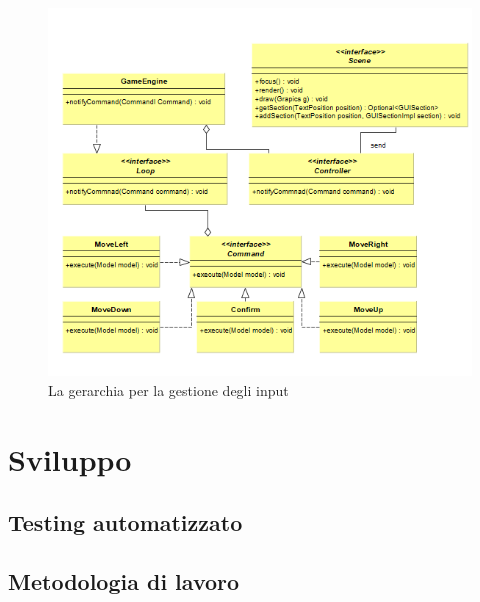 \documentclass[a4paper,12pt, hidelinks]{report}
\begin{document}
\begin{figure}[H]
\centering{}
\includegraphics[width=\linewidth]{img/PatternCommand}
\caption{La gerarchia per la gestione degli input}
\label{img:GerarchiaSound}
\end{figure}


\chapter{Sviluppo}
\section{Testing automatizzato}


\section{Metodologia di lavoro}
\end{document}
